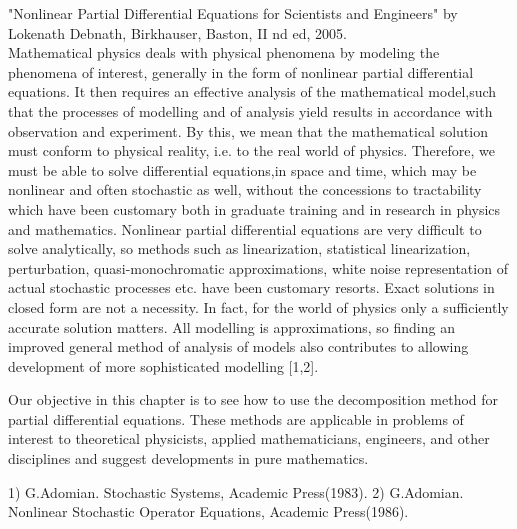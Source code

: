 "Nonlinear Partial Differential Equations for Scientists and Engineers" by Lokenath Debnath, Birkhauser, Baston, II nd ed, 2005.\\


Mathematical physics deals with physical phenomena by modeling the phenomena of interest, generally in the form of nonlinear partial
differential equations. It then requires an effective analysis of the mathematical model,such that the processes of modelling and of
analysis yield results in accordance with observation and experiment. By this, we mean that the mathematical solution must conform to
physical reality, i.e. to the real world of physics. Therefore, we must be able to solve differential equations,in space and time, which
may be nonlinear and often stochastic as well, without the concessions to tractability which have been customary both in graduate training
and in research in physics and mathematics. Nonlinear partial differential equations are very difficult to solve analytically, so methods
such as linearization, statistical linearization, perturbation, quasi-monochromatic approximations, white noise representation of actual
stochastic processes etc. have been customary resorts. Exact solutions in closed form are not a necessity. In fact, for the world of physics
only a sufficiently accurate solution matters. All modelling is approximations, so finding an improved general method of analysis of models
also contributes to allowing development of more sophisticated modelling [1,2].


Our objective in this chapter is to see how to use the decomposition method for partial differential equations. These methods are applicable in
problems of interest to theoretical physicists, applied mathematicians, engineers, and other disciplines and suggest developments in pure mathematics.

1) G.Adomian. Stochastic Systems, Academic Press(1983). 2) G.Adomian.
Nonlinear Stochastic Operator Equations, Academic Press(1986).

